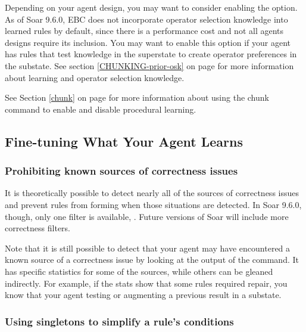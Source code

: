 Depending on your agent design, you may want to consider enabling the  option.  As of Soar 9.6.0, EBC does not incorporate operator selection knowledge into learned rules by default, since there is a performance cost and not all agents designs require its inclusion.  You may want to enable this option if your agent has rules that test knowledge in the superstate to create operator preferences in the substate.  See section \ref{CHUNKING-prior-osk} on page \pageref{CHUNKING-prior-osk} for more information about learning and operator selection knowledge. 

See Section \ref{chunk} on page \pageref{chunk} for more information about using the chunk command to enable and disable procedural learning.


\subsection{Fine-tuning What Your Agent Learns}
\label{CHUNKING-usage-tuning}

\subsubsection{Prohibiting known sources of correctness issues}
\label{CHUNKING-usage-tuning-correctness}

It is theoretically possible to detect nearly all of the sources of correctness issues and prevent rules from forming when those situations are detected.  In Soar 9.6.0, though, only one filter is available, .  Future versions of Soar will include more correctness filters.

Note that it is still possible to detect that your agent may have encountered a known source of a correctness issue by looking at the output of the  command.  It has specific statistics for some of the sources, while others can be gleaned indirectly.  For example, if the stats show that some rules required repair, you know that your agent testing or augmenting a previous result in a substate.

\subsubsection{Using singletons to simplify a rule's conditions}
\label{CHUNKING-usage-tuning-conditions}


